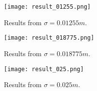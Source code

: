 \documentclass[11pt]{article}
\begin{document}
\begin{homeworkProblem}
\begin{figure}[!ht]
\begin{centering}
            \end{centering}
        \end{figure}
        \begin{figure}[!ht]
            
            \begin{centering}
                \texttt{[image: result\_01255.png]}

            \caption{Results from $\sigma = 0.01255m$.}

            \end{centering}
        \end{figure}

        \begin{figure}[!ht]
            
            \begin{centering}
                \texttt{[image: result\_018775.png]}

            \caption{Results from $\sigma = 0.018775m$.}

            \end{centering}
        \end{figure}

        \begin{figure}[!ht]
            
            \begin{centering}
                \texttt{[image: result\_025.png]}

            \caption{Results from $\sigma = 0.025m$.}

            \end{centering}
        \end{figure}



\end{homeworkProblem}
\end{document}
